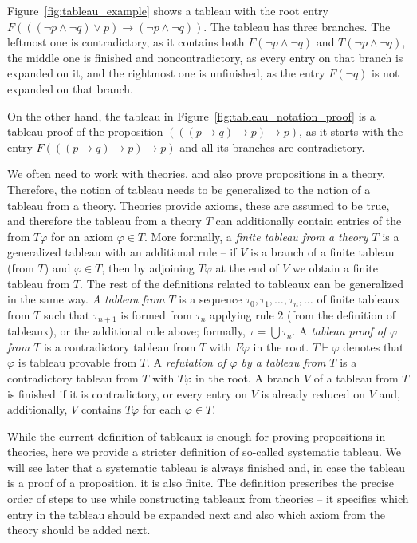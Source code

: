 Figure~\ref{fig:tableau_example} shows a tableau with the root entry $F(((\neg p \land \neg q) \lor p) \to (\neg p \land \neg q))$. The tableau has three branches. The leftmost one is contradictory, as it contains both $F (\neg p \land \neg q)$ and $T (\neg p \land \neg q)$, the middle one is finished and noncontradictory, as every entry on that branch is expanded on it, and the rightmost one is unfinished, as the entry $F (\neg q)$ is not expanded on that branch.

On the other hand, the tableau in Figure~\ref{fig:tableau_notation_proof} is a tableau proof of the proposition $(((p \to q) \to p) \to p)$, as it starts with the entry $F(((p \to q) \to p) \to p)$ and all its branches are contradictory.

We often need to work with theories, and also prove propositions in a theory. Therefore, the notion of tableau needs to be generalized to the notion of a tableau from a theory. Theories provide axioms, these are assumed to be true, and therefore the tableau from a theory $T$ can additionally contain entries of the from $T \varphi$ for an axiom $\varphi \in T$. More formally, a \emph{finite tableau from a theory $T$} is a generalized tableau with an additional rule -- if $V$ is a branch of a finite tableau (from $T$) and $\varphi \in T$, then by adjoining $T \varphi$ at the end of $V$ we obtain a finite tableau from $T$. The rest of the definitions related to tableaux can be generalized in the same way. \emph{A tableau from $T$} is a sequence $\tau_0, \tau_1, \dots, \tau_n, \dots$ of finite tableaux from $T$ such that $\tau_{n+1}$ is formed from $\tau_n$ applying rule 2 (from the definition of tableaux), or the additional rule above; formally, $\tau = \bigcup \tau_n$. A \emph{tableau proof of $\varphi$ from $T$} is a contradictory tableau from $T$ with $F \varphi$ in the root. $T \vdash \varphi$ denotes that $\varphi$ is tableau provable from $T$. A \emph{refutation of $\varphi$ by a tableau from $T$} is a contradictory tableau from $T$ with $T \varphi$ in the root. A branch $V$ of a tableau from $T$ is finished if it is contradictory, or every entry on $V$ is already reduced on $V$ and, additionally, $V$ contains $T \varphi$ for each $\varphi \in T$.

While the current definition of tableaux is enough for proving propositions in theories, here we provide a stricter definition of so-called systematic tableau. We will see later that a systematic tableau is always finished and, in case the tableau is a proof of a proposition, it is also finite. The definition prescribes the precise order of steps to use while constructing tableaux from theories -- it specifies which entry in the tableau should be expanded next and also which axiom from the theory should be added next.

